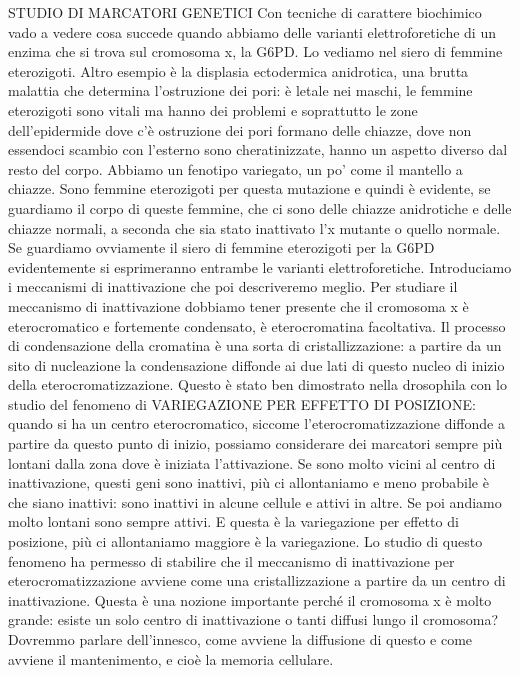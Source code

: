 \documentclass[11pt]{book}
\begin{document}
STUDIO DI MARCATORI GENETICI
Con tecniche di carattere biochimico vado a vedere cosa succede quando abbiamo delle varianti elettroforetiche di un enzima che si trova sul cromosoma x, la G6PD. Lo vediamo nel siero di femmine eterozigoti.
Altro esempio è la displasia ectodermica anidrotica, una brutta malattia che determina l’ostruzione dei pori: è letale nei maschi, le femmine eterozigoti sono vitali ma hanno dei problemi e soprattutto le zone dell’epidermide dove c’è ostruzione dei pori formano delle chiazze, dove non essendoci scambio con l’esterno sono cheratinizzate, hanno un aspetto diverso dal resto del corpo. Abbiamo un fenotipo variegato, un po' come il mantello a chiazze. Sono femmine eterozigoti per questa mutazione e quindi è evidente, se guardiamo il corpo di queste femmine, che ci sono delle chiazze anidrotiche e delle chiazze normali, a seconda che sia stato inattivato l’x mutante o quello normale. 
Se guardiamo ovviamente il siero di femmine eterozigoti per la G6PD evidentemente si esprimeranno entrambe le varianti elettroforetiche.
Introduciamo i meccanismi di inattivazione che poi descriveremo meglio.
Per studiare il meccanismo di inattivazione dobbiamo tener presente che il cromosoma x è eterocromatico e fortemente condensato, è eterocromatina facoltativa. Il processo di condensazione della cromatina è una sorta di cristallizzazione: a partire da un sito di nucleazione la condensazione diffonde ai due lati di questo nucleo di inizio della eterocromatizzazione. Questo è stato ben dimostrato nella drosophila con lo studio del fenomeno di VARIEGAZIONE PER EFFETTO DI POSIZIONE: quando si ha un centro eterocromatico, siccome l’eterocromatizzazione diffonde a partire da questo punto di inizio, possiamo considerare dei marcatori sempre più lontani dalla zona dove è iniziata l’attivazione. Se sono molto vicini al centro di inattivazione, questi geni sono inattivi, più ci allontaniamo e meno probabile è che siano inattivi: sono inattivi in alcune cellule e attivi in altre. Se poi andiamo molto lontani sono sempre attivi. E questa è la variegazione per effetto di posizione, più ci allontaniamo maggiore è la variegazione. Lo studio di questo fenomeno ha permesso di stabilire che il meccanismo di inattivazione per eterocromatizzazione avviene come una cristallizzazione a partire da un centro di inattivazione. Questa è una nozione importante perché il cromosoma x è molto grande: esiste un solo centro di inattivazione o tanti diffusi lungo il cromosoma? Dovremmo parlare dell’innesco, come avviene la diffusione di questo e come avviene il mantenimento, e cioè la memoria cellulare. 
\end{document}
